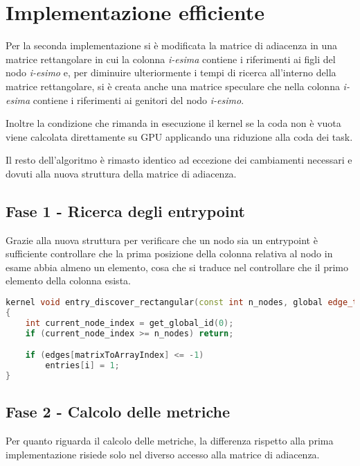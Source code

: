 \documentclass[../relazione.tex]{subfiles}
\begin{document}
\section{Implementazione efficiente}
Per la seconda implementazione si è modificata la matrice di adiacenza in una matrice rettangolare in cui la colonna \textit{i-esima} contiene i riferimenti ai figli del nodo \textit{i-esimo} e, per diminuire ulteriormente i tempi di ricerca all'interno della matrice rettangolare, si è creata anche una matrice speculare che nella colonna \textit{i-esima} contiene i riferimenti ai genitori del nodo \textit{i-esimo}.

Inoltre la condizione che rimanda in esecuzione il kernel se la coda non è vuota viene calcolata direttamente su GPU applicando una riduzione alla coda dei task.

Il resto dell'algoritmo è rimasto identico ad eccezione dei cambiamenti necessari e dovuti alla nuova struttura della matrice di adiacenza.

\subsection{Fase 1 - Ricerca degli entrypoint}
Grazie alla nuova struttura per verificare che un nodo sia un entrypoint è sufficiente controllare che la prima posizione della colonna relativa al nodo in esame abbia almeno un elemento, cosa che si traduce nel controllare che il primo elemento della colonna esista. 
\begin{lstlisting}[language=C++, caption={Find entrypoints kernel II},captionpos=b]
kernel void entry_discover_rectangular(const int n_nodes, global edge_t* restrict edges, volatile global int* n_entries, global int* entries)
{
	int current_node_index = get_global_id(0);
	if (current_node_index >= n_nodes) return;

	if (edges[matrixToArrayIndex] <= -1)
		entries[i] = 1;
}
\end{lstlisting}

\subsection{Fase 2 - Calcolo delle metriche}
Per quanto riguarda il calcolo delle metriche, la differenza rispetto alla prima implementazione risiede solo nel diverso accesso alla matrice di adiacenza.
\end{document}
